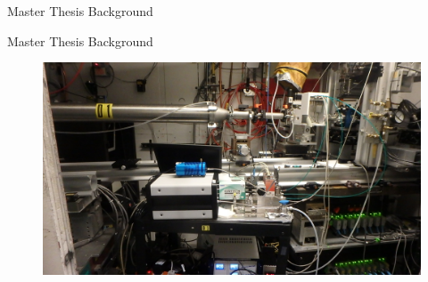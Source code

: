 \documentclass[10pt]{beamer}
\begin{document}
\begin{frame}{Master Thesis Background}
\begin{figure}
\end{figure}

	\end{frame}

\begin{frame}{Master Thesis Background}
\begin{figure}
	\includegraphics[scale=0.15]{chess3.JPG}
\end{figure}
\end{frame}
\end{document}
